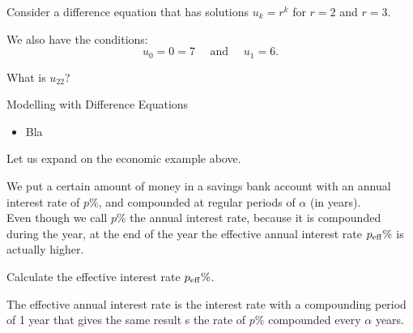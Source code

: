 \bookonlynewpage


\question
	Consider a difference equation that has solutions $u_k = r^k$ for $r=2$ and $r=3$.
	
	We also have the conditions:
	$$ 
	u_0 = 0 = 7 \quad \text{ and } \quad u_1=6.
	$$
	
	What is $u_{22}$?




%
%



\begin{module}{Modelling with Difference Equations}
	\label{diff:model}

	
	
\end{module}



\begin{lesson}

	\begin{itemize}
		\item Bla
	\end{itemize}
	

\end{lesson}


\newpage

\question
	Let us expand on the economic example above.
	
	We put a certain amount of money in a savings bank account with an annual interest rate of $p\%$, and compounded at regular periods of $\alpha$ (in years). \\
	
	Even though we call $p\%$ the annual interest rate, because it is compounded during the year, at the end of the year the effective annual interest rate $p_{\rm eff}\%$ is actually higher.
	
	Calculate the effective interest rate $p_{\rm eff}\%$.

\begin{annotation}
\begin{goals}
	The effective annual interest rate is the interest rate with a compounding period of 1 year that gives the same result s the rate of $p\%$ compounded every $\alpha$ years.
\end{goals}
\end{annotation}

